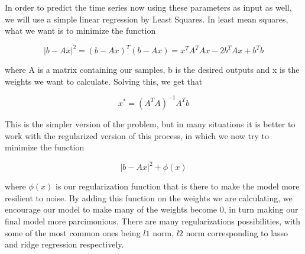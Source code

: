 \documentclass[../main.tex]{subfiles}
\begin{document}
    In order to predict the time series now using these parameters as input as well, we will use a simple linear regression by Least Squares. In least mean squares, what we want is to minimize the function

    $$|b-Ax|^2 = (b-Ax)^T(b-Ax) = x^TA^TAx -2b^TAx+b^Tb$$

    where A is a matrix containing our samples, b is the desired outputs and x is the weights we want to calculate. Solving this, we get that

    $$x^* = (A^TA)^{-1}A^Tb$$

    This is the simpler version of the problem, but in many situations it is better to work with the regularized version of this process, in which we now try to minimize the function

    $$|b-Ax|^2 + \phi(x)$$

    where $\phi(x)$ is our regularization function that is there to make the model more resilient to noise. By adding this function on the weights we are calculating, we encourage our model to make many of the weights become 0, in turn making our final model more parcimonious. There are many regularizations possibilities, with some of the most common ones being $l1$ norm, $l2$ norm corresponding to lasso and ridge regression respectively.

    
        
\end{document}
